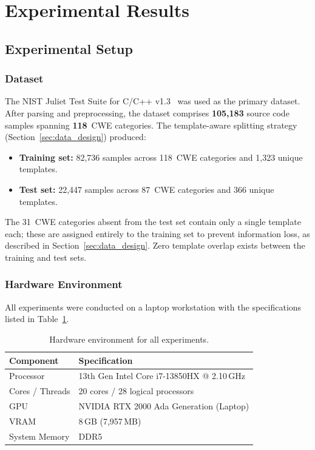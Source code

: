 
\section{Experimental Results}
\label{sec:results}

\subsection{Experimental Setup}
\label{sec:setup}

\subsubsection{Dataset}
The NIST Juliet Test Suite for C/C++ v1.3~\cite{juliet2017} was used as the
primary dataset.  After parsing and preprocessing, the dataset comprises
\textbf{105,183} source code samples spanning \textbf{118}~CWE categories.
The template-aware splitting strategy (Section~\ref{sec:data_design})
produced:
\begin{itemize}
    \item \textbf{Training set:} 82,736 samples across 118~CWE categories
          and 1,323 unique templates.
    \item \textbf{Test set:} 22,447 samples across 87~CWE categories
          and 366 unique templates.
\end{itemize}
The 31~CWE categories absent from the test set contain only a single
template each; these are assigned entirely to the training set to prevent
information loss, as described in Section~\ref{sec:data_design}.
Zero template overlap exists between the training and test sets.

\subsubsection{Hardware Environment}
All experiments were conducted on a laptop workstation with the
specifications listed in Table~\ref{tab:hardware}.

\begin{table}[t]
\centering
\caption{Hardware environment for all experiments.}
\label{tab:hardware}
\begin{tabular}{ll}
\hline
\textbf{Component}    & \textbf{Specification} \\
\hline
Processor             & 13th Gen Intel Core i7-13850HX @ 2.10\,GHz \\
Cores / Threads       & 20 cores / 28 logical processors \\
GPU                   & NVIDIA RTX 2000 Ada Generation (Laptop) \\
VRAM                  & 8\,GB (7,957\,MB) \\
System Memory         & DDR5 \\
\hline
\end{tabular}
\end{table}

